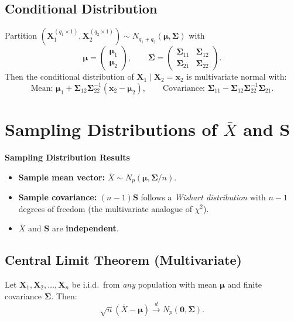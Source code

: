 \documentclass[12pt, a4paper]{article}
\newcommand{\Xbar}{\bar{X}}
\newcommand{\muv}{\boldsymbol{\mu}}
\newcommand{\Sig}{\boldsymbol{\Sigma}}
\newcommand{\Np}{N_p}
\begin{document}
\subsection{Conditional Distribution}

Partition $(\mathbf{X}_1^{(q_1\times1)}, \mathbf{X}_2^{(q_2\times1)}) \sim N_{q_1+q_2}(\muv, \Sig)$ with
\[
  \muv = \begin{pmatrix}\muv_1\\\muv_2\end{pmatrix}, \qquad
  \Sig = \begin{pmatrix}\Sig_{11}&\Sig_{12}\\\Sig_{21}&\Sig_{22}\end{pmatrix}.
\]
Then the conditional distribution of $\mathbf{X}_1 \mid \mathbf{X}_2 = \mathbf{x}_2$ is multivariate normal with:
\[
  \text{Mean: } \muv_1 + \Sig_{12}\Sig_{22}^{-1}(\mathbf{x}_2 - \muv_2),
  \qquad
  \text{Covariance: } \Sig_{11} - \Sig_{12}\Sig_{22}^{-1}\Sig_{21}.
\]

\section{Sampling Distributions of $\Xbar$ and $\mathbf{S}$}

\begin{keybox}\noindent\textbf{Sampling Distribution Results}\par\smallskip
\begin{itemize}
  \item \textbf{Sample mean vector:} $\Xbar \sim \Np(\muv, \Sig/n)$.
  \item \textbf{Sample covariance:} $(n-1)\mathbf{S}$ follows a \emph{Wishart distribution}
        with $n-1$ degrees of freedom (the multivariate analogue of $\chi^2$).
  \item $\Xbar$ and $\mathbf{S}$ are \textbf{independent}.
\end{itemize}
\end{keybox}

\subsection{Central Limit Theorem (Multivariate)}

Let $\mathbf{X}_1,\mathbf{X}_2,\ldots,\mathbf{X}_n$ be i.i.d.\ from \emph{any} population
with mean $\muv$ and finite covariance $\Sig$. Then:
\[
  \sqrt{n}(\Xbar - \muv) \xrightarrow{d} \Np(\mathbf{0},\Sig).
\]
\end{document}
